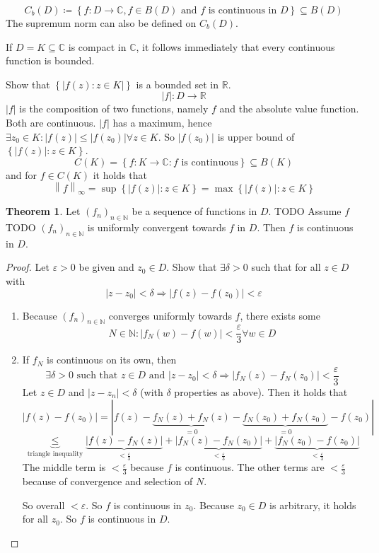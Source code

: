 \documentclass[a4paper,landscape,twocolumn]{article}
\theoremstyle{definition}
\newtheorem{theorem}{Theorem}
\newcommand\set[1]{\left\{#1\right\}}
\newcommand\abs[1]{\left|#1\right|}
\newcommand\seq[1]{{\left(#1\right)}_{n \in \mathbb N}}
\newcommand\norm[1]{\left\|#1\right\|}
\begin{document}
\[ C_b(D) \coloneqq \set{f: D \to \mathbb C, f \in B(D) \text{ and } f \text{ is continuous in } D} \subseteq B(D) \]
The supremum norm can also be defined on $C_b(D)$.

If $D = K \subseteq \mathbb C$ is compact in $\mathbb C$,
it follows immediately that every continuous function is bounded.

Show that $\set{\abs{f(z): z \in K}}$ is a bounded set in $\mathbb R$.
\[ \abs{f}: D \to \mathbb R \]
$\abs{f}$ is the composition of two functions, namely $f$ and the absolute value
function. Both are continuous. $\abs{f}$ has a maximum, hence $\exists z_0 \in K:
\abs{f(z)} \leq \abs{f(z_0)} \forall z \in K$. So $\abs{f(z_0)}$ is upper bound of
$\set{\abs{f(z)}: z \in K}$.
\[ C(K) = \set{f: K \to \mathbb C: f \text{ is continuous}} \subseteq B(K) \]
and for $f \in C(K)$ it holds that
\[ \norm{f}_\infty = \sup\set{\abs{f(z)}: z \in K} = \max\set{\abs{f(z)}: z \in K} \]

\begin{theorem}
  Let $(f_n)_{n\in\mathbb N}$ be a sequence of functions in $D$.
  TODO
  Assume $f$ TODO
  $\seq{f_n}$ is uniformly convergent towards $f$ in $D$. Then $f$ is continuous in $D$.
\end{theorem}
\begin{proof}
  Let $\varepsilon > 0$ be given and $z_0 \in D$.
  Show that $\exists \delta > 0$ such that for all $z \in D$ with
  \[ \abs{z - z_0} < \delta \Rightarrow \abs{f(z) - f(z_0)} < \varepsilon \]
  \begin{enumerate}
    \item Because $\seq{f_n}$ converges uniformly towards $f$, there exists some
      \[ N \in \mathbb N: \abs{f_N(w) - f(w)} < \frac\varepsilon3 \forall w \in D \]
    \item If $f_N$ is continuous on its own, then
      \[
        \exists \delta > 0 \text{ such that } z \in D \text{ and } \abs{z - z_0} < \delta \Rightarrow
        \abs{f_N(z) - f_N(z_0)} < \frac\varepsilon3
      \]
      Let $z \in D$ and $\abs{z - z_n} < \delta$ (with $\delta$ properties as above).
      Then it holds that
      \[
        \abs{f(z) - f(z_0)}
          = \abs{f(z) - \underbrace{f_N(z) + f_N(z)}_{=0}
          - \underbrace{f_N(z_0) + f_N(z_0)}_{=0} - f(z_0)}
      \]
      \[
        \underbrace{\leq}_{\text{triangle inequality}} \underbrace{\abs{f(z) - f_N(z)}}_{< \frac\varepsilon3}
        + \underbrace{\abs{f_N(z) - f_N(z_0)}}_{<\frac\varepsilon3}
        + \underbrace{\abs{f_N(z_0) - f(z_0)}}_{< \frac\varepsilon3}
      \]
      The middle term is $< \frac\varepsilon3$ because $f$ is continuous.
      The other terms are $< \frac\varepsilon3$ because of convergence and selection of $N$.

      So overall $< \varepsilon$. So $f$ is continuous in $z_0$.
      Because $z_0 \in D$ is arbitrary, it holds for all $z_0$. So $f$ is continuous in $D$.
  \end{enumerate}
\end{proof}
\end{document}
